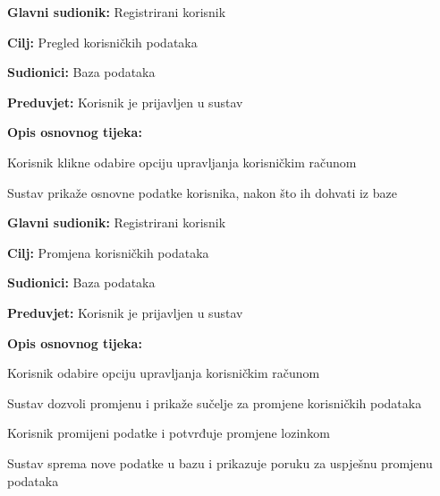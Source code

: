 \noindent {}
\begin{packed_item}

	\item \textbf{Glavni sudionik: } Registrirani korisnik
	\item  \textbf{Cilj:} Pregled korisničkih podataka
	\item  \textbf{Sudionici:} Baza podataka
	\item  \textbf{Preduvjet:} Korisnik je prijavljen u sustav
	\item  \textbf{Opis osnovnog tijeka:}

	\item[] \begin{packed_enum}

		\item Korisnik klikne odabire opciju upravljanja korisničkim računom
		\item Sustav prikaže osnovne podatke korisnika, nakon što ih dohvati iz baze
	\end{packed_enum}

\end{packed_item}

\noindent {}
\begin{packed_item}

	\item \textbf{Glavni sudionik: } Registrirani korisnik
	\item  \textbf{Cilj:} Promjena korisničkih podataka
	\item  \textbf{Sudionici:} Baza podataka
	\item  \textbf{Preduvjet:} Korisnik je prijavljen u sustav
	\item  \textbf{Opis osnovnog tijeka:}

	\item[] \begin{packed_enum}

		\item Korisnik odabire opciju upravljanja korisničkim računom
		\item Sustav dozvoli promjenu i prikaže sučelje za promjene korisničkih
		podataka
		\item Korisnik promijeni podatke i potvrđuje promjene lozinkom
		\item Sustav sprema nove podatke u bazu i prikazuje poruku za uspješnu
		promjenu podataka
	\end{packed_enum}

\end{packed_item}

